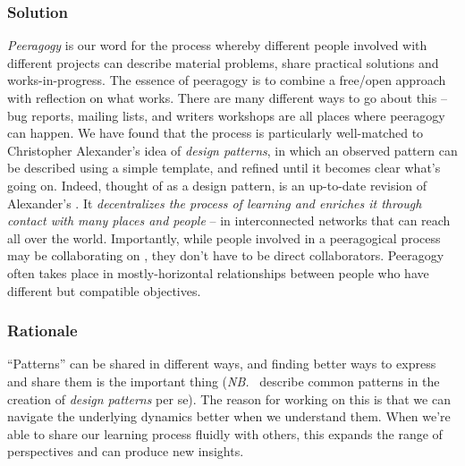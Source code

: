 \subsubsection*{Solution} \emph{Peeragogy} is our word for the process whereby different people involved with different projects can describe material problems, share practical solutions and works-in-progress.  The essence of peeragogy is to combine a free/open approach with reflection on what works.  There are many different ways to go about this -- bug reports, mailing lists, and writers workshops are all places where peeragogy can happen.  We have found that the process is particularly well-matched to Christopher Alexander's idea of \emph{design patterns}, in which an observed pattern can be described using a simple template, and refined until it becomes clear what's going on.  Indeed, thought of as a design pattern,  is an up-to-date revision of Alexander's  \cite[p. 99]{alexander1977pattern}.  It \emph{decentralizes the process of learning and enriches it through contact with many places and people} -- in interconnected networks that can reach all over the world.   Importantly, while people involved in a peeragogical process may be collaborating on , they don't have to be direct collaborators.  Peeragogy often takes place in mostly-horizontal relationships between people who have different but compatible objectives.

\subsubsection*{Rationale}
``Patterns'' can be shared in different ways, and finding better ways to express and share them is the important thing (\emph{NB.}~\cite{meszaros1998pattern} describe common patterns in the creation of \emph{design patterns} per se).  The reason for working on this is that we can navigate the underlying dynamics better when we understand them.  When we're able to share our learning process fluidly with others, this expands the range of perspectives and can produce new insights. 


